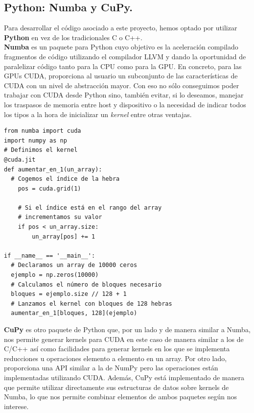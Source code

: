\subsection{Python: Numba y CuPy.}
Para desarrollar el código asociado a este proyecto, hemos optado por utilizar \textbf{Python} en vez de los tradicionales C o C++. \\

\textbf{Numba} \cite{numba} es un paquete para Python cuyo objetivo es la aceleración compilado fragmentos de código utilizando el compilador LLVM y dando la oportunidad de paralelizar código tanto para la CPU como para la GPU. En concreto, para las GPUs CUDA, proporciona al usuario un subconjunto de las características de CUDA con un nivel de abstracción mayor. Con eso no sólo conseguimos poder trabajar con CUDA desde Python sino, también evitar, si lo deseamos, manejar los traspasos de memoria entre host y dispositivo o la necesidad de indicar todos los tipos a la hora de inicializar un \textit{kernel} entre otras ventajas.
\begin{code}
\begin{verbatim}
from numba import cuda
import numpy as np
# Definimos el kernel
@cuda.jit
def aumentar_en_1(un_array):
  # Cogemos el índice de la hebra
    pos = cuda.grid(1)

    # Si el índice está en el rango del array
    # incrementamos su valor
    if pos < un_array.size:
        un_array[pos] += 1

if __name__ == '__main__':
  # Declaramos un array de 10000 ceros
  ejemplo = np.zeros(10000)
  # Calculamos el número de bloques necesario
  bloques = ejemplo.size // 128 + 1
  # Lanzamos el kernel con bloques de 128 hebras
  aumentar_en_1[bloques, 128](ejemplo)
\end{verbatim}
\label{code:numbaexample}
\end{code}

\textbf{CuPy} \cite{cupy} es otro paquete de Python que, por un lado y de manera similar a Numba, nos permite generar kernels para CUDA en este caso de manera similar a los de C/C++ así como facilidades para generar kernels en los que se implementa reducciones u operaciones elemento a elemento en un array. Por otro lado, proporciona una API similar a la de NumPy pero las operaciones están implementadas utilizando CUDA. Además, CuPy está implementado de manera que permite utilizar directamente sus estructuras de datos sobre kernels de Numba, lo que nos permite combinar elementos de ambos paquetes según nos interese.


